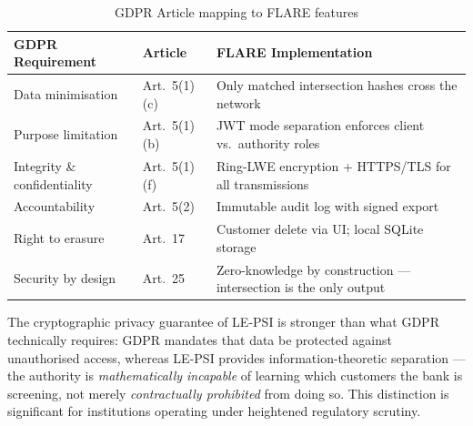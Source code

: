 \begin{table}[H]
\centering
\caption{GDPR Article mapping to FLARE features}
\label{tab:gdpr}
\begin{tabular}{@{}p{3.5cm}p{4cm}p{5cm}@{}}
\toprule
\textbf{GDPR Requirement} & \textbf{Article} & \textbf{FLARE Implementation} \\
\midrule
Data minimisation      & Art.~5(1)(c) & Only matched intersection hashes cross the network \\
Purpose limitation     & Art.~5(1)(b) & JWT mode separation enforces client vs.\ authority roles \\
Integrity \& confidentiality & Art.~5(1)(f) & Ring-LWE encryption + HTTPS/TLS for all transmissions \\
Accountability         & Art.~5(2)    & Immutable audit log with signed export \\
Right to erasure       & Art.~17      & Customer delete via UI; local SQLite storage \\
Security by design     & Art.~25      & Zero-knowledge by construction --- intersection is the only output \\
\bottomrule
\end{tabular}
\end{table}

The cryptographic privacy guarantee of LE-PSI is stronger than what GDPR technically
requires: GDPR mandates that data be protected against unauthorised access, whereas
LE-PSI provides information-theoretic separation --- the authority is \textit{mathematically
incapable} of learning which customers the bank is screening, not merely \textit{contractually
prohibited} from doing so. This distinction is significant for institutions operating
under heightened regulatory scrutiny.

\clearpage
